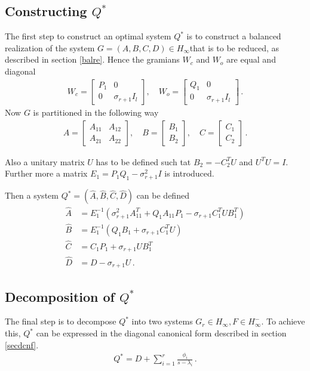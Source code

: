 \subsection{Constructing \(Q^{*}\)}
The first step to construct an optimal system \(Q^{*}\) is to construct a balanced realization of the system \(G = (A, B, C, D) \in H_{\infty}\)that is to be reduced, as described in section \ref{balre}.
Hence the gramians \(W_c\) and \(W_o\) are equal and diagonal
\begin{gather}
W_c = \begin{bmatrix}
P_1 & 0 \\
0 & \sigma_{r+1}I_l
\end{bmatrix}, \quad
W_o = \begin{bmatrix}
Q_1 & 0 \\
0 & \sigma_{r+1}I_l
\end{bmatrix} \,. 
\end{gather}
Now \(G\) is partitioned in the following way
\begin{gather}
A = \begin{bmatrix}
A_{11} & A_{12} \\
A_{21} & A_{22}
\end{bmatrix}, \quad 
B = \begin{bmatrix}
B_{1}  \\
B_{2} 
\end{bmatrix}, \quad 
C = \begin{bmatrix}
C_{1}  \\
C_{2} 
\end{bmatrix} \,.
\end{gather}

Also a unitary matrix \(U\) has to be defined such tat \(B_2 = -C_2^TU\) and \(U^TU = I\). 
Further more a matrix \(E_1 = P_1Q_1-\sigma_{r+1}^2I\) is introduced.

Then a system \(Q^* = (\hat{A}, \hat{B}, \hat{C}, \hat{D})\) can be defined \cite{sandberg}
\begin{align}
\hat{A} &= E_1^{-1}(\sigma_{r+1}^2A_{11}^T + Q_1 A_{11}P_1 - \sigma_{r+1}C_1^TUB_1^T) \\
\hat{B} &= E_1^{-1}(Q_1B_1 + \sigma_{r+1}C_1^TU)\\
\hat{C} &= C_1P_1 + \sigma_{r+1}UB_1^T \\
\hat{D} &= D - \sigma_{r+1}U \,.
\end{align}

\subsection{Decomposition of \(Q^{*}\)}
The final step is to decompose \(Q^{*}\) into two systems \(G_r \in H_{\infty}, F \in H_{\infty}^{-}\).
To achieve this, \(Q^{*}\) can be expressed in the diagonal canonical form described in section \ref{secdcnf}.
\begin{gather}
Q^{*} = D + \sum_{i=1}^{r} \frac{\phi_i}{s-\lambda_i} \,.
\end{gather}

